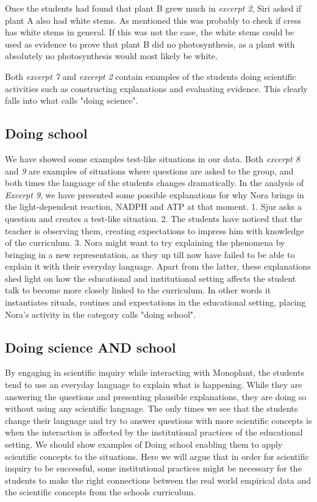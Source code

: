 Once the students had found that plant B grew much in \emph{excerpt 2}, Siri asked if plant A also had white stems. As mentioned this was probably to check if cress has white stems in general. If this was not the case, the white stems could be used as evidence to prove that plant B did no photosynthesis, as a plant with absolutely no photosynthesis would most likely be white. 

Both \emph{excerpt 7} and \emph{excerpt 2} contain examples of the students doing scientific activities such as constructing explanations and evaluating evidence. This clearly falls into what \citet{jimenez2000doing} calls "doing science".

\subsection{Doing school}
We have showed some examples test-like situations in our data. Both \emph{excerpt 8} and \emph{9} are examples of situations where questions are asked to the group, and both times the language of the students changes dramatically. In the analysis of \emph{Excerpt 9}, we have presented some possible explanations for why Nora brings in the light-dependent reaction, NADPH and ATP at that moment. 1. Sjur asks a question and creates a test-like situation. 2. The students have noticed that the teacher is observing them, creating expectations to impress him with knowledge of the curriculum. 3. Nora might want to try explaining the phenomena by bringing in a new representation, as they up till now have failed to be able to explain it with their everyday language. Apart from the latter, these explanations shed light on how the educational and institutional setting affects the student talk to become more closely linked to the curriculum. In other words it instantiates rituals, routines and expectations in the educational setting, placing Nora's activity in the category \citet{jimenez2000doing} calls "doing school". 


\subsection{Doing science AND school}
By engaging in scientific inquiry while interacting with Monoplant, the students tend to use an everyday language to explain what is happening. While they are answering the questions and presenting plausible explanations, they are doing so without using any scientific language. The only times we see that the students change their language and try to answer questions with more scientific concepts is when the interaction is affected by the institutional practices of the educational setting.  We should show examples of Doing school enabling them to apply scientific concepts to the situations.
Here we will argue that in order for scientific inquiry to be successful, some institutional practices might be necessary for the students to make the right connections between the real world empirical data and the scientific concepts from the schools curriculum. 

